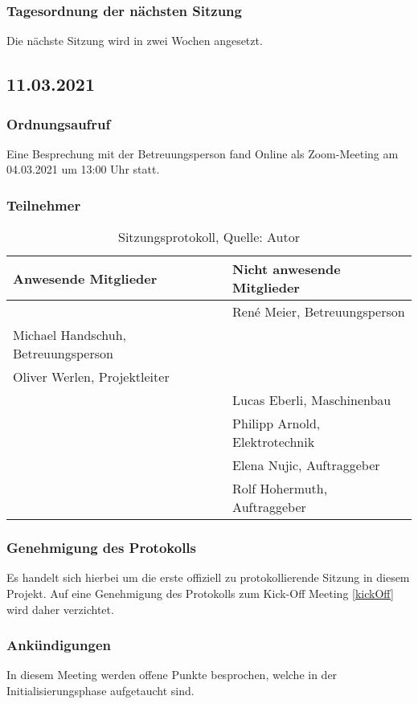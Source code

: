 \subsubsection{Tagesordnung der nächsten Sitzung}
Die nächste Sitzung wird in zwei Wochen angesetzt. 
\newpage
\subsection{11.03.2021}\label{Betreuermeeting1}
\subsubsection{Ordnungsaufruf}
Eine Besprechung mit der Betreuungsperson fand Online als Zoom-Meeting am 04.03.2021 um 13:00 Uhr statt.
\subsubsection{Teilnehmer}
\begin{table}[H]
	\setlength\extrarowheight{2pt} %
	\begin{tabularx}{\textwidth}{|X|X|}
		\hline
		\textbf{Anwesende Mitglieder} &  \textbf{Nicht anwesende Mitglieder} \\
		\hline
		& René Meier, Betreuungsperson  \\
		Michael Handschuh, Betreuungsperson &   \\
		Oliver Werlen, Projektleiter & \\
		& Lucas Eberli, Maschinenbau \\
		&Philipp Arnold, Elektrotechnik \\
		&Elena Nujic, Auftraggeber \\
		&Rolf Hohermuth, Auftraggeber \\
		\hline
	\end{tabularx}
	\caption{ \label{tbl: Teilnehmerliste vom 11.03.2021}Sitzungsprotokoll, Quelle: Autor}
\end{table}
\subsubsection{Genehmigung des Protokolls}
Es handelt sich hierbei um die erste offiziell zu protokollierende Sitzung in diesem Projekt. Auf eine Genehmigung des Protokolls zum Kick-Off Meeting \ref{kickOff} wird daher verzichtet. 
\subsubsection{Ankündigungen}
In diesem Meeting werden offene Punkte besprochen, welche in der Initialisierungsphase aufgetaucht sind. 
